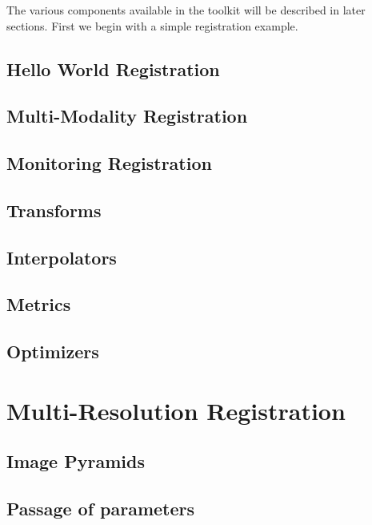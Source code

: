 The various components available in the toolkit will be described in later sections.
First we begin with a simple registration example.

\section{Hello World Registration}
\label{sec:IntroductionImageRegistration}
%

\section{Multi-Modality Registration}
\label{sec:MultiModalityRegistration}
%

\section{Monitoring Registration}
\label{sec:MonitoringImageRegistration}



\section{Transforms}
\label{sec:Transforms}


\section{Interpolators}
\label{sec:Interpolators}


\section{Metrics}
\label{sec:Metrics}


\section{Optimizers}
\label{sec:Optimizers}


\chapter{Multi-Resolution Registration}
\label{sec:MultiResolutionRegistration}

\section{Image Pyramids}
\label{sec:ImagePyramids}


\section{Passage of parameters}
\label{sec:MultiResolutionParametersPassing}


